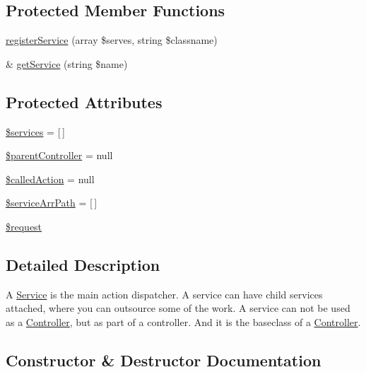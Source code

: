 \subsection*{Protected Member Functions}
\begin{DoxyCompactItemize}
\item 
\hyperlink{classWEPPO_1_1Controller_1_1Service_a8827d0f34711f678a79d45022cb605be}{register\+Service} (array \$serves, string \$classname)
\item 
\& \hyperlink{classWEPPO_1_1Controller_1_1Service_a39a3a2a3214e9e84305655683f8eefcb}{get\+Service} (string \$name)
\end{DoxyCompactItemize}
\subsection*{Protected Attributes}
\begin{DoxyCompactItemize}
\item 
\hyperlink{classWEPPO_1_1Controller_1_1Service_a5b64c7141eebd4233342985ee9eca236}{\$services} = \mbox{[}$\,$\mbox{]}
\item 
\hyperlink{classWEPPO_1_1Controller_1_1Service_ad21c89cadbd889023ade358e1a340505}{\$parent\+Controller} = null
\item 
\hyperlink{classWEPPO_1_1Controller_1_1Service_ad6e534e2ccd0f39b86f0ade64209296e}{\$called\+Action} = null
\item 
\hyperlink{classWEPPO_1_1Controller_1_1Service_a866d6d4731f3e15041a73e551fef847d}{\$service\+Arr\+Path} = \mbox{[}$\,$\mbox{]}
\item 
\hyperlink{classWEPPO_1_1Controller_1_1Service_aab9a070609bf114a6d53c8c4259b4401}{\$request}
\end{DoxyCompactItemize}


\subsection{Detailed Description}
A \hyperlink{classWEPPO_1_1Controller_1_1Service}{Service} is the main action dispatcher. A service can have child services attached, where you can outsource some of the work. A service can not be used as a \hyperlink{classWEPPO_1_1Controller_1_1Controller}{Controller}, but as part of a controller. And it is the baseclass of a \hyperlink{classWEPPO_1_1Controller_1_1Controller}{Controller}. 

\subsection{Constructor \& Destructor Documentation}
